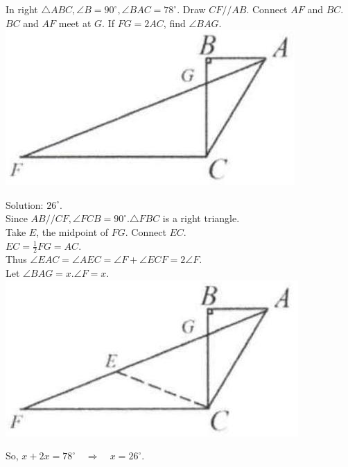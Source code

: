 \documentclass{article}
\begin{document}
In right \(\triangle A B C, \angle B=90^{\circ}, \angle B A C=78^{\circ}\). Draw \(C F / / A B\). Connect \(A F\) and \(B C\). \(B C\) and \(A F\) meet at \(G\). If \(F G=2 A C\), find \(\angle B A G\).\\
\centering
\includegraphics[width=\textwidth]{images/009(2).jpg}


Solution: \(26^{\circ}\).\\
Since \(A B / / C F, \angle F C B=90^{\circ} . \triangle F B C\) is a right triangle.\\
Take \(E\), the midpoint of \(F G\). Connect \(E C\).\\
\(E C=\frac{1}{2} F G=A C\).\\
Thus \(\angle E A C=\angle A E C=\angle F+\angle E C F=2 \angle F\).\\
Let \(\angle B A G=x . \angle F=x\).\\
\centering
\includegraphics[width=\textwidth]{images/010(2).jpg}

So, \(x+2 x=78^{\circ} \quad \Rightarrow \quad x=26^{\circ}\).\\
\end{document}
